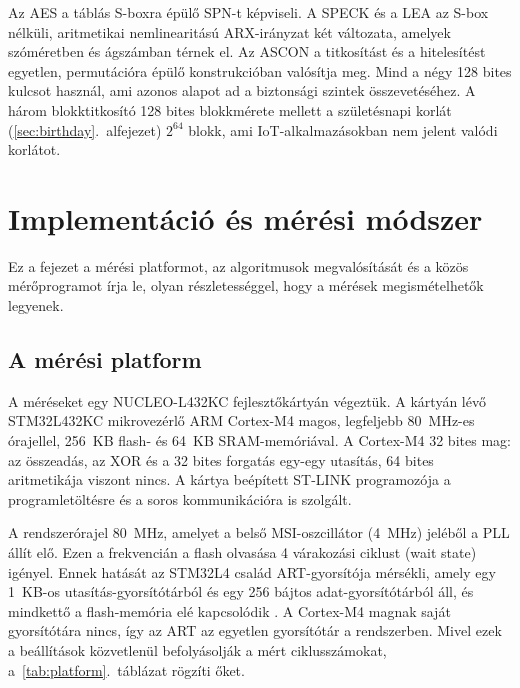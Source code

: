 \documentclass[a4paper,12pt]{report}
\theoremstyle{definition}
\theoremstyle{remark}
\begin{document}
Az AES a táblás S-boxra épülő SPN-t képviseli. A SPECK és a LEA az S-box nélküli, aritmetikai nemlinearitású ARX-irányzat két változata, amelyek szóméretben és ágszámban térnek el. Az ASCON a titkosítást és a hitelesítést egyetlen, permutációra épülő konstrukcióban valósítja meg. Mind a négy 128 bites kulcsot használ, ami azonos alapot ad a biztonsági szintek összevetéséhez. A három blokktitkosító 128 bites blokkmérete mellett a születésnapi korlát (\ref{sec:birthday}.~alfejezet) $2^{64}$ blokk, ami IoT-alkalmazásokban nem jelent valódi korlátot.

\chapter{Implementáció és mérési módszer}\label{chap:implementacio}

Ez a fejezet a mérési platformot, az algoritmusok megvalósítását és a közös mérőprogramot írja le, olyan részletességgel, hogy a mérések megismételhetők legyenek.

\section{A mérési platform}\label{sec:platform}

A méréseket egy NUCLEO-L432KC fejlesztőkártyán végeztük. A kártyán lévő STM32L432KC mikrovezérlő ARM Cortex-M4 magos, legfeljebb 80~MHz-es órajellel, 256~KB flash- és 64~KB SRAM-memóriával. A Cortex-M4 32 bites mag: az összeadás, az XOR és a 32 bites forgatás egy-egy utasítás, 64 bites aritmetikája viszont nincs. A kártya beépített ST-LINK programozója a programletöltésre és a soros kommunikációra is szolgált.

A rendszerórajel 80~MHz, amelyet a belső MSI-oszcillátor (4~MHz) jeléből a PLL állít elő. Ezen a frekvencián a flash olvasása 4 várakozási ciklust (wait state) igényel. Ennek hatását az STM32L4 család ART-gyorsítója mérsékli, amely egy 1~KB-os utasítás-gyorsítótárból és egy 256 bájtos adat-gyorsítótárból áll, és mindkettő a flash-memória elé kapcsolódik \cite{RM0394}. A Cortex-M4 magnak saját gyorsítótára nincs, így az ART az egyetlen gyorsítótár a rendszerben. Mivel ezek a beállítások közvetlenül befolyásolják a mért ciklusszámokat, a~\ref{tab:platform}.~táblázat rögzíti őket.
\end{document}

